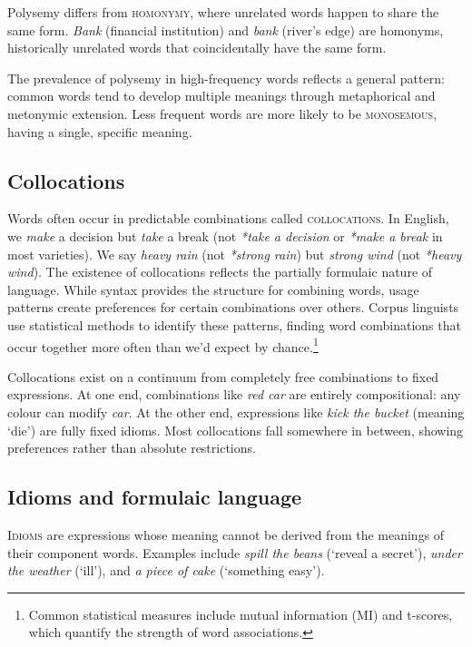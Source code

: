 Polysemy differs from \textsc{homonymy}, where unrelated words happen to share the same form. \textit{Bank} (financial institution) and \textit{bank} (river's edge) are homonyms, historically unrelated words that coincidentally have the same form.

The prevalence of polysemy in high-frequency words reflects a general pattern: common words tend to develop multiple meanings through metaphorical and metonymic extension. Less frequent words are more likely to be \textsc{monosemous}, having a single, specific meaning.

\subsection{Collocations} \label{sec:collocations}

Words often occur in predictable combinations called \textsc{collocations}. In English, we \textit{make} a decision but \textit{take} a break (not \textit{*take a decision} or \textit{*make a break} in most varieties). We say \textit{heavy rain} (not \textit{*strong rain}) but \textit{strong wind} (not \textit{*heavy wind}). The existence of collocations reflects the partially formulaic nature of language. While syntax provides the structure for combining words, usage patterns create preferences for certain combinations over others. Corpus linguists use statistical methods to identify these patterns, finding word combinations that occur together more often than we'd expect by chance.\footnote{Common statistical measures include mutual information (MI) and t-scores, which quantify the strength of word associations.}

Collocations exist on a continuum from completely free combinations to fixed expressions. At one end, combinations like \textit{red car} are entirely compositional: any colour can modify \textit{car}. At the other end, expressions like \textit{kick the bucket} (meaning `die') are fully fixed idioms. Most collocations fall somewhere in between, showing preferences rather than absolute restrictions.

\subsection{Idioms and formulaic language}

\textsc{Idioms} are expressions whose meaning cannot be derived from the meanings of their component words. Examples include \textit{spill the beans} (`reveal a secret'), \textit{under the weather} (`ill'), and \textit{a piece of cake} (`something easy').


